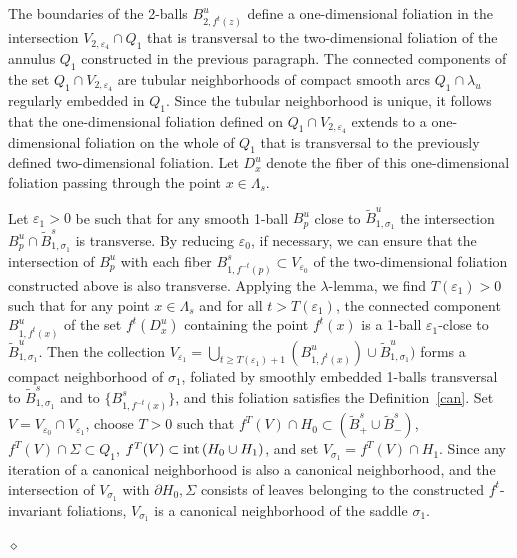 \documentclass[%
 aip,
 amsmath,amssymb,
preprint,%
]{revtex4-1}
\newenvironment{proof}{{\bf Proof:}}
{\hfill $\diamond$\medskip}
\begin{document}
\begin{proof}
The boundaries of the 2-balls $B^u_{2,f^t(z)}$ define a one-dimensional foliation in the intersection $V_{2,\varepsilon_4}\cap Q_1$ that is transversal to the two-dimensional foliation of the annulus $Q_1$ constructed in the previous paragraph. The connected components of the set $Q_1\cap V_{2,\varepsilon_4}$ are tubular neighborhoods of compact smooth arcs $Q_1\cap \lambda_u$ regularly embedded in $Q_1$. Since the tubular neighborhood is unique, it follows that the one-dimensional  foliation defined on $Q_1\cap V_{2,\varepsilon_4}$ extends to a one-dimensional foliation on the whole of $Q_1$ that is transversal to the previously defined two-dimensional foliation. Let $D^u_x$ denote the fiber of this one-dimensional foliation passing through the point $x\in \Lambda_s$.

Let $\varepsilon_{1}>0$ be such that for any smooth 1-ball $B^u_p$ close to $\widetilde B^u_{1,\sigma_1}$ the intersection $B^u_p\cap \widetilde B^s_{1,\sigma_1}$ is transverse. By reducing $\varepsilon_0$, if necessary, we can ensure that the intersection of $B^u_p$ with each fiber $B^s_{1,f^{-t}(p)}\subset V_{\varepsilon_0}$ of the two-dimensional foliation constructed above is also transverse. Applying the $\lambda$-lemma, we find $T(\varepsilon_1)>0$ such that for any point $x\in \Lambda_s$ and for all $t>T(\varepsilon_1)$, the connected component $B^u_{1,f^t(x)}$ of the set $f^{t}(D^u_{x})$ containing the point $f^{t}(x)$ is a 1-ball $\varepsilon_1$-close to $\widetilde B^u_{1,\sigma_1}$. Then the collection $V_{\varepsilon_1}=\bigcup\limits_{t\geq T(\varepsilon_1)+1} (B^u_{1,f^t(x)})\cup \widetilde B^u_{1,\sigma_1})$ forms a compact neighborhood of $\sigma_1$, foliated by smoothly embedded 1-balls transversal to $\widetilde B^s_{1,\sigma_1}$ and to $\{B^s_{1,f^{-t}(x)}\}$, and this foliation satisfies the Definition~\ref{can}. Set $V=V_{\varepsilon_0}\cap V_{\varepsilon_1}$, choose $T>0$ such that $f^T(V)\cap H_0\subset (\widetilde B^s_+\cup \widetilde B^s_-)$, $f^T(V)\cap \Sigma\subset Q_1$, $f^T(V)\subset {\rm int}\,(H_0\cup H_1)$,
and set $V_{\sigma_1}=f^T(V)\cap H_1$. Since any iteration of a canonical neighborhood is also a canonical neighborhood, and the intersection of $V_{\sigma_1}$ with $\partial H_0, \Sigma$ consists of leaves belonging to the constructed $f^t$-invariant foliations, $V_{\sigma_1}$ is a canonical neighborhood of the saddle $\sigma_1$.


\end{proof}
\end{document}
